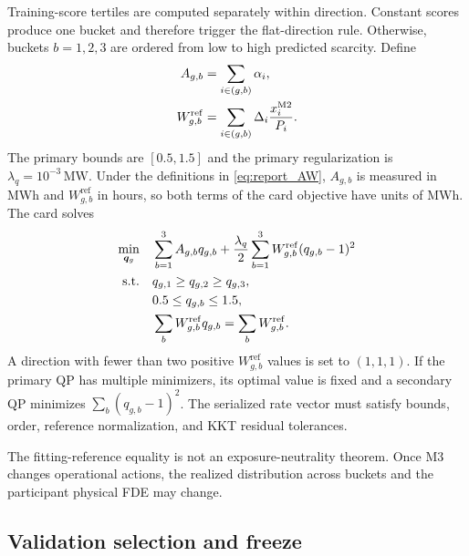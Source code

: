 \documentclass[10pt,journal,onecolumn]{IEEEtran}
\newcommand{\Mtwo}{\ensuremath{\mathrm{M2}}}
\begin{document}
Training-score tertiles are computed separately within direction. Constant
scores produce one bucket and therefore trigger the flat-direction rule.
Otherwise, buckets $b=1,2,3$ are ordered from low to high predicted scarcity.
Define
\begin{align}
A_{g,b}
&=\sum_{i\in(g,b)}\alpha_i,
\notag\\
W_{g,b}^{\mathrm{ref}}
&=\sum_{i\in(g,b)}\Delta_i\frac{x_i^{\Mtwo}}{P_i}.
\label{eq:report_AW}
\end{align}
The primary bounds are $[0.5,1.5]$ and the primary regularization is
$\lambda_q=10^{-3}\,\mathrm{MW}$. Under the definitions in
\eqref{eq:report_AW}, $A_{g,b}$ is measured in MWh and
$W_{g,b}^{\mathrm{ref}}$ in hours, so both terms of the card objective have
units of MWh. The card solves
\begin{align}
\min_{\bm q_g}\quad
&\sum_{b=1}^3A_{g,b}q_{g,b}
+\frac{\lambda_q}{2}\sum_{b=1}^3
 W_{g,b}^{\mathrm{ref}}(q_{g,b}-1)^2
\label{eq:report_card_qp}\\
\mathrm{s.t.}\quad
&q_{g,1}\geq q_{g,2}\geq q_{g,3},
\notag\\
&0.5\leq q_{g,b}\leq1.5,
\notag\\
&\sum_bW_{g,b}^{\mathrm{ref}}q_{g,b}
=\sum_bW_{g,b}^{\mathrm{ref}}.
\notag
\end{align}
A direction with fewer than two positive $W_{g,b}^{\mathrm{ref}}$ values is
set to $(1,1,1)$. If the primary QP has multiple minimizers, its optimal value
is fixed and a secondary QP minimizes $\sum_b(q_{g,b}-1)^2$. The serialized
rate vector must satisfy bounds, order, reference normalization, and KKT
residual tolerances.

The fitting-reference equality is not an exposure-neutrality theorem. Once
M3 changes operational actions, the realized distribution across buckets and
the participant physical FDE may change.

\subsection{Validation selection and freeze}
\end{document}
